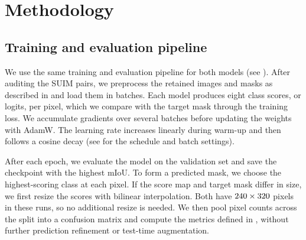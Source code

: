 \section{Methodology}
\label{sec:method}


\subsection{Training and evaluation pipeline}
\label{sec:pipeline}
We use the same training and evaluation pipeline for both models
(see ). After auditing the SUIM pairs, we preprocess the
retained images and masks as described in  and load
them in batches. Each model produces eight class scores, or logits, per pixel,
which we compare with the target mask through the training loss. We accumulate
gradients over several batches before updating the weights with AdamW. The
learning rate increases linearly during warm-up and then follows a cosine decay
(see  for the schedule and batch settings).

After each epoch, we evaluate the model on the validation set and save the
checkpoint with the highest mIoU. To form a predicted mask, we choose the
highest-scoring class at each pixel. If the score map and target mask differ in
size, we first resize the scores with bilinear interpolation. Both have
$240\times320$ pixels in these runs, so no additional
resize is needed. We then pool pixel counts across the split into a confusion
matrix and compute the metrics defined in , without further
prediction refinement or test-time augmentation.

